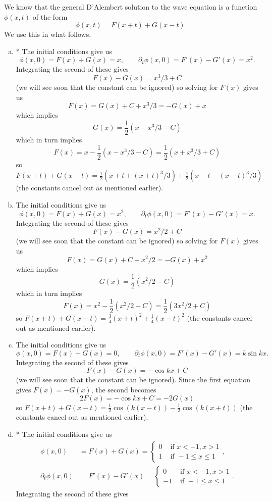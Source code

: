 \documentclass[12pt]{article}
\begin{document}
\begin{answer}
We know that the general D'Alembert solution to the wave equation is a function $\phi(x,t)$ of the form
\[\phi(x,t)=F(x+t)+G(x-t).\]
We use this in what follows.
\begin{enumerate}[(a)]
\item * The initial conditions give us
\[\phi(x,0)=F(x)+G(x)=x,\qquad\partial_t\phi(x,0)=F'(x)-G'(x)=x^2.\]
Integrating the second of these gives
\[F(x)-G(x)=x^3/3+C\]
(we will see soon that the constant can be ignored) so solving for $F(x)$ gives us
\[F(x)=G(x)+C+x^3/3=-G(x)+x\]
which implies
\[G(x)=\frac{1}{2}(x-x^3/3-C)\]
which in turn implies
\[F(x)=x-\frac{1}{2}(x-x^3/3-C)=\frac{1}{2}(x+x^3/3+C)\]
so $F(x+t)+G(x-t)=\frac{1}{2}(x+t+(x+t)^3/3)+\frac{1}{2}(x-t-(x-t)^3/3)$ (the constants cancel out as mentioned earlier).
\item  The initial conditions give us
\[\phi(x,0)=F(x)+G(x)=x^2,\qquad\partial_t\phi(x,0)=F'(x)-G'(x)=x.\]
Integrating the second of these gives
\[F(x)-G(x)=x^2/2+C\]
(we will see soon that the constant can be ignored) so solving for $F(x)$ gives us
\[F(x)=G(x)+C+x^2/2=-G(x)+x^2\]
which implies
\[G(x)=\frac{1}{2}(x^2/2-C)\]
which in turn implies
\[F(x)=x^2-\frac{1}{2}(x^2/2-C)=\frac{1}{2}(3x^2/2+C)\]
so $F(x+t)+G(x-t)=\frac{3}{4}(x+t)^2+\frac{1}{4}(x-t)^2$ (the constants cancel out as mentioned earlier).
\item The initial conditions give us
\[\phi(x,0)=F(x)+G(x)=0,\qquad\partial_t\phi(x,0)=F'(x)-G'(x)=k\sin kx.\]
Integrating the second of these gives
\[F(x)-G(x)=-\cos kx+C\]
(we will see soon that the constant can be ignored). Since the first equation gives $F(x)=-G(x)$, the second becomes
\[2F(x)=-\cos kx+C=-2G(x)\]
so $F(x+t)+G(x-t)=\frac{1}{2}\cos(k(x-t))-\frac{1}{2}\cos(k(x+t))$ (the constants cancel out as mentioned earlier).
\item * The initial conditions give us
\begin{align*}
\phi(x,0)&=F(x)+G(x)=\begin{cases}
0&\mbox{ if }x<-1,x>1\\
1&\mbox{ if }-1\leq x\leq 1
\end{cases},\\
\partial_t\phi(x,0)&=F'(x)-G'(x)=\begin{cases}
0&\mbox{ if }x<-1,x>1\\
-1&\mbox{ if }-1\leq x\leq 1
\end{cases}.\end{align*}
Integrating the second of these gives

\end{enumerate}
\end{answer}
\end{document}
